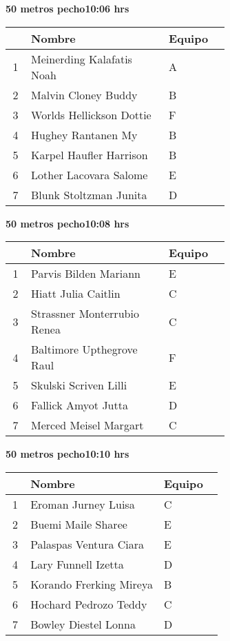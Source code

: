 \begin{minipage}{0.95\linewidth}
\begin{center}
\textbf{
50 metros pecho\hspace{1cm}10:06 hrs}
\end{center}
\begin{tabular}{cp{0.63\linewidth}l}
\hline
& \textbf{Nombre} & \textbf{Equipo} \\ \hline
1 & Meinerding Kalafatis Noah & A \\ 
2 & Malvin Cloney Buddy & B \\ 
3 & Worlds Hellickson Dottie & F \\ 
4 & Hughey Rantanen My & B \\ 
5 & Karpel Haufler Harrison & B \\ 
6 & Lother Lacovara Salome & E \\ 
7 & Blunk Stoltzman Junita & D \\ 
\end{tabular}
\end{minipage}
\begin{minipage}{0.95\linewidth}
\begin{center}
\textbf{
50 metros pecho\hspace{1cm}10:08 hrs}
\end{center}
\begin{tabular}{cp{0.63\linewidth}l}
\hline
& \textbf{Nombre} & \textbf{Equipo} \\ \hline
1 & Parvis Bilden Mariann & E \\ 
2 & Hiatt Julia Caitlin & C \\ 
3 & Strassner Monterrubio Renea & C \\ 
4 & Baltimore Upthegrove Raul & F \\ 
5 & Skulski Scriven Lilli & E \\ 
6 & Fallick Amyot Jutta & D \\ 
7 & Merced Meisel Margart & C \\ 
\end{tabular}
\end{minipage}
\begin{minipage}{0.95\linewidth}
\begin{center}
\textbf{
50 metros pecho\hspace{1cm}10:10 hrs}
\end{center}
\begin{tabular}{cp{0.63\linewidth}l}
\hline
& \textbf{Nombre} & \textbf{Equipo} \\ \hline
1 & Eroman Jurney Luisa & C \\ 
2 & Buemi Maile Sharee & E \\ 
3 & Palaspas Ventura Ciara & E \\ 
4 & Lary Funnell Izetta & D \\ 
5 & Korando Frerking Mireya & B \\ 
6 & Hochard Pedrozo Teddy & C \\ 
7 & Bowley Diestel Lonna & D \\ 
\end{tabular}
\end{minipage}

